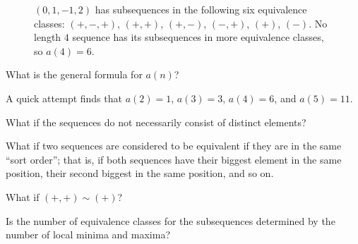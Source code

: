 \documentclass{article}
\begin{document}
\begin{figure}[!h]
\hspace{0.5cm}
    \caption{
      $(0, 1, -1, 2)$ has subsequences in the following six equivalence classes:
      $(+, -, +)$, $(+, +)$, $(+, -)$, $(-, +)$, $(+)$, $(-)$. No length $4$
      sequence has its subsequences in more equivalence classes, so $a(4) = 6$.
    }
  \end{figure}

\begin{question}
  What is the general formula for $a(n)$?
\end{question}
\begin{note}
  A quick attempt finds that $a(2) = 1$, $a(3) = 3$, $a(4)=6$, and $a(5)=11$.
\end{note}
\begin{related}
  \item What if the sequences do not necessarily consist of distinct elements?
  \item What if two sequences are considered to be equivalent if they are in the
    same ``sort order''; that is, if both sequences have their biggest element
    in the same position, their second biggest in the same position, and so on.
  \item What if $(+, +) \sim (+)$?
  \item Is the number of equivalence classes for the subsequences determined by
   the number of local minima and maxima?
\end{related}
\end{document}

